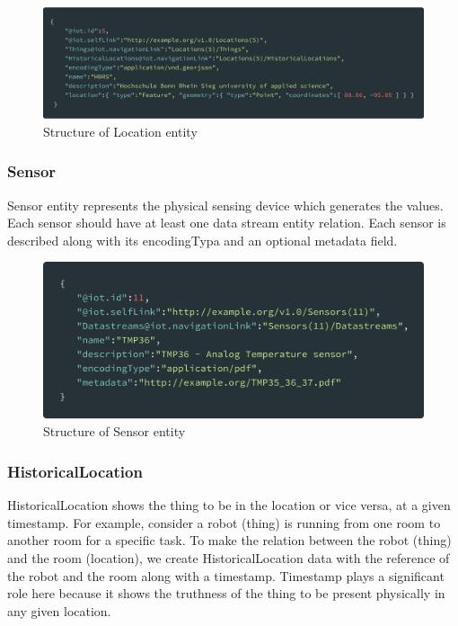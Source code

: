 	\begin{figure}[!htbp] 
		\begin{center}
			\includegraphics[scale=0.1]{./images/png/ogc/location}	
			\caption{Structure of Location entity}	
			\label{fig:location}	
		\end{center}
	\end{figure}

	\subsubsection{Sensor}
	Sensor entity represents the physical sensing device which generates the values. Each sensor should have at least one data stream entity relation. Each sensor is described along with its encodingTypa and an optional metadata field.
	
	\begin{figure}[!htbp] 
		\begin{center}
			\includegraphics[scale=0.1]{./images/png/ogc/sensor}	
			\caption{Structure of Sensor entity}	
			\label{fig:sensor}	
		\end{center}
	\end{figure}

	\subsubsection{HistoricalLocation}
	HistoricalLocation shows the thing to be in the location or vice versa, at a given timestamp. For example, consider a robot (thing) is running from one room to another room for a specific task. To make the relation between the robot (thing) and the room (location), we create HistoricalLocation data with the reference of the robot and the room along with a timestamp. Timestamp plays a significant role here because it shows the truthness of the thing to be present physically in any given location.
	
